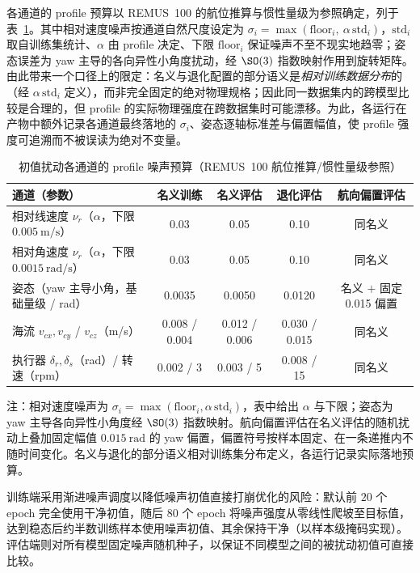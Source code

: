 各通道的 profile 预算以 REMUS~100 的航位推算与惯性量级为参照确定，列于表~\ref{tab:noise-budget}。其中相对速度噪声按通道自然尺度设定为 \(\sigma_i=\max(\text{floor}_i,\ \alpha\,\mathrm{std}_i)\)，\(\mathrm{std}_i\) 取自训练集统计、\(\alpha\) 由 profile 决定、下限 \(\text{floor}_i\) 保证噪声不至不现实地趋零；姿态误差为 yaw 主导的各向异性小角度扰动，经 \(\SO(3)\) 指数映射作用到旋转矩阵。由此带来一个口径上的限定：名义与退化配置的部分语义是\emph{相对训练数据分布}的（经 \(\alpha\,\mathrm{std}_i\) 定义），而非完全固定的绝对物理规格；因此同一数据集内的跨模型比较是合理的，但 profile 的实际物理强度在跨数据集时可能漂移。为此，各运行在产物中额外记录各通道最终落地的 \(\sigma_i\)、姿态逐轴标准差与偏置幅值，使 profile 强度可追溯而不被误读为绝对不变量。

\begin{table}[htbp]
  \centering
  \caption{初值扰动各通道的 profile 噪声预算（REMUS~100 航位推算/惯性量级参照）}
  \label{tab:noise-budget}
  \small
  \begin{tabularx}{\textwidth}{>{\raggedright\arraybackslash}X cccc}
    \toprule
    通道（参数） & 名义训练 & 名义评估 & 退化评估 & 航向偏置评估 \\
    \midrule
    相对线速度 \(\nu_r\)（\(\alpha\)，下限 \(0.005~\mathrm{m/s}\)）& 0.03 & 0.05 & 0.10 & 同名义 \\
    相对角速度 \(\nu_r\)（\(\alpha\)，下限 \(0.0015~\mathrm{rad/s}\)）& 0.03 & 0.05 & 0.10 & 同名义 \\
    姿态（yaw 主导小角，基础量级 / rad）& 0.0035 & 0.0050 & 0.0120 & 名义 \(+\) 固定 0.015 偏置 \\
    海流 \(v_{cx},v_{cy}\) / \(v_{cz}\)（m/s）& 0.008 / 0.004 & 0.012 / 0.006 & 0.030 / 0.015 & 同名义 \\
    执行器 \(\delta_r,\delta_s\)（rad）/ 转速（rpm）& 0.002 / 3 & 0.003 / 5 & 0.008 / 15 & 同名义 \\
    \bottomrule
  \end{tabularx}
  \par\vspace{2pt}
  \footnotesize 注：相对速度噪声为 \(\sigma_i=\max(\text{floor}_i,\alpha\,\mathrm{std}_i)\)，表中给出 \(\alpha\) 与下限；姿态为 yaw 主导各向异性小角度经 \(\SO(3)\) 指数映射。航向偏置评估在名义评估的随机扰动上叠加固定幅值 \(0.015~\mathrm{rad}\) 的 yaw 偏置，偏置符号按样本固定、在一条递推内不随时间变化。名义与退化的部分语义相对训练集分布定义，各运行记录实际落地预算。
\end{table}

训练端采用渐进噪声调度以降低噪声初值直接打崩优化的风险：默认前 \(20\) 个 epoch 完全使用干净初值，随后 \(80\) 个 epoch 将噪声强度从零线性爬坡至目标值，达到稳态后约半数训练样本使用噪声初值、其余保持干净（以样本级掩码实现）。评估端则对所有模型固定噪声随机种子，以保证不同模型之间的被扰动初值可直接比较。

